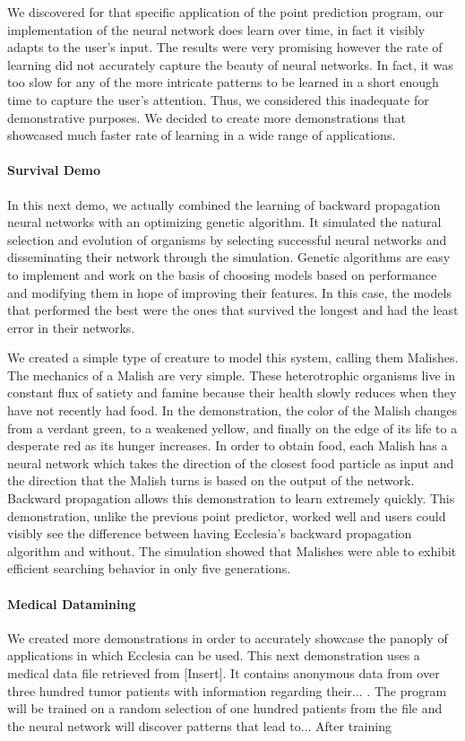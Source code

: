 \documentclass[letterpaper, 10pt]{article}
\begin{document}
		We discovered for that specific application of the point prediction program, our implementation of the neural network does learn over time, in fact it visibly adapts to the user's input. The results were very promising however the rate of learning did not accurately capture the beauty of neural networks. In fact, it was too slow for any of the more intricate patterns to be learned in a short enough time to capture the user's attention. Thus, we considered this inadequate for demonstrative purposes. We decided to create more demonstrations that showcased much faster rate of learning in a wide range of applications.
		
		\paragraph{Survival Demo}
		In this next demo, we actually combined the learning of backward propagation neural networks with an optimizing genetic algorithm. It simulated the natural selection and evolution of organisms by selecting successful neural networks and disseminating their network through the simulation. Genetic algorithms are easy to implement and work on the basis of choosing models based on performance and modifying them in hope of improving their features. In this case, the models that performed the best were the ones that survived the longest and had the least error in their networks.
		
		We created a simple type of creature to model this system, calling them Malishes. The mechanics of a Malish are very simple. These heterotrophic organisms live in constant flux of satiety and famine because their health slowly reduces when they have not recently had food. In the demonstration, the color of the Malish changes from a verdant green, to a weakened yellow, and finally on the edge of its life to a desperate red as its hunger increases. In order to obtain food, each Malish has a neural network which takes the direction of the closest food particle as input and the direction that the Malish turns is based on the output of the network. Backward propagation allows this demonstration to learn extremely quickly. This demonstration, unlike the previous point predictor, worked well and users could visibly see the difference between having Ecclesia's backward propagation algorithm and without. The simulation showed that Malishes were able to exhibit efficient searching behavior in only five generations.
		
		\paragraph{Medical Datamining}
		We created more demonstrations in order to accurately showcase the panoply of applications in which Ecclesia can be used. This next demonstration uses a medical data file retrieved from [Insert]. It contains anonymous data from over three hundred tumor patients with information regarding their... . The program will be trained on a random selection of one hundred patients from the file and the neural network will discover patterns that lead to... After training 
		
\end{document}
